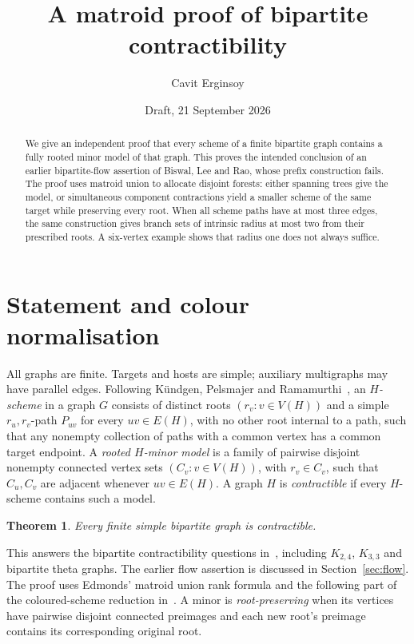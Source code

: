 \documentclass[11pt]{amsart}
\title[Bipartite contractibility]{A matroid proof of bipartite contractibility}
\author{Cavit Erginsoy}
\date{Draft, 21 September 2026}
\newtheorem{theorem}{Theorem}[section]
\begin{document}
\begin{abstract}
We give an independent proof that every scheme of a finite bipartite
graph contains a fully rooted minor model of that graph. This proves
the intended conclusion of an earlier bipartite-flow assertion of
Biswal, Lee and Rao, whose prefix construction fails. The proof uses
matroid union to allocate disjoint forests: either spanning trees give
the model, or simultaneous component contractions yield a smaller
scheme of the same target while preserving every root.
When all scheme paths have at most three edges, the same construction
gives branch sets of intrinsic radius at most two from their prescribed
roots. A six-vertex example shows that radius one does not always suffice.
\end{abstract}
\maketitle

\section{Statement and colour normalisation}

All graphs are finite. Targets and hosts are simple; auxiliary
multigraphs may have parallel edges. Following K\"undgen, Pelsmajer and
Ramamurthi~\cite[Definitions 1.1 and 2.1]{KPR}, an \emph{$H$-scheme}
in a graph $G$ consists of distinct roots $(r_v:v\in V(H))$ and a simple
$r_u,r_v$-path $P_{uv}$ for every $uv\in E(H)$, with no other root
internal to a path, such that any nonempty collection of paths with a common
vertex has a common target endpoint.
A \emph{rooted $H$-minor model} is a family of pairwise disjoint nonempty
connected vertex sets $(C_v:v\in V(H))$, with $r_v\in C_v$, such that
$C_u,C_v$ are adjacent whenever $uv\in E(H)$. A graph $H$ is
\emph{contractible} if every $H$-scheme contains such a model.

\begin{theorem}\label{thm:main}
Every finite simple bipartite graph is contractible.
\end{theorem}

This answers the bipartite contractibility questions
in~\cite[Section 8, Questions 2--4]{KPR}, including $K_{2,4}$, $K_{3,3}$
and bipartite theta graphs. The earlier flow assertion is discussed in
Section~\ref{sec:flow}.
The proof uses Edmonds' matroid union rank formula and the following
part of the coloured-scheme reduction in~\cite[Lemma 3.3]{KPR}.
A minor is \emph{root-preserving} when its vertices have
pairwise disjoint connected preimages and each new root's preimage
contains its corresponding original root.
\end{document}

